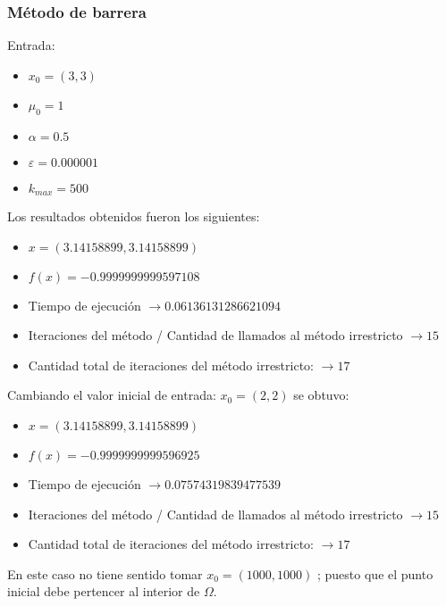 \documentclass[titlepage, 11pt]{scrartcl}
\begin{document}
	\subsubsection{Método de barrera}
	Entrada:
	\begin{itemize}
		\item $x_0 = (3, 3)$
		\item $\mu_0 = 1$
		\item $\alpha = 0.5$
		\item $\varepsilon = 0.000001$
		\item $k_{max} = 500$
	\end{itemize}
	Los resultados obtenidos fueron los siguientes:
	\begin{itemize}
		\item $x = (3.14158899, 3.14158899)$
		\item $f(x) = -0.9999999999597108$
		\item Tiempo de ejecución $\rightarrow 0.06136131286621094$
		\item Iteraciones del método / Cantidad de llamados al método irrestricto $\rightarrow 15$
		\item Cantidad total de iteraciones del método irrestricto: $\rightarrow 17$
	\end{itemize}
	
	Cambiando el valor inicial de entrada: $x_0 = (2, 2)$ se obtuvo:
	\begin{itemize}
		\item $x = (3.14158899, 3.14158899)$
		\item $f(x) = -0.9999999999596925$
		\item Tiempo de ejecución $\rightarrow 0.07574319839477539$
		\item Iteraciones del método / Cantidad de llamados al método irrestricto $\rightarrow 15$
		\item Cantidad total de iteraciones del método irrestricto: $\rightarrow 17$
	\end{itemize}
	En este caso no tiene sentido  tomar $x_0 = (1000, 1000)$ ; puesto que el punto inicial debe pertencer al interior de $\Omega$.
	
\end{document}

